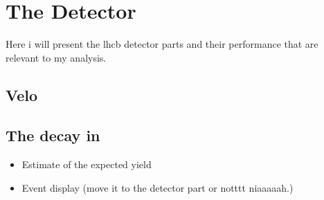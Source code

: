 
\chapter{The \lhcb Detector}
\label{The_lhcb_Det}

Here i will present the lhcb detector parts and their performance that are relevant to my analysis.

\section{Velo}

\section{The \BJpsiKst decay in \lhcb}

\begin{itemize}

\item Estimate of the expected yield
  \item Event display (move it to the detector part or notttt niaaaaah.)

\end{itemize}
